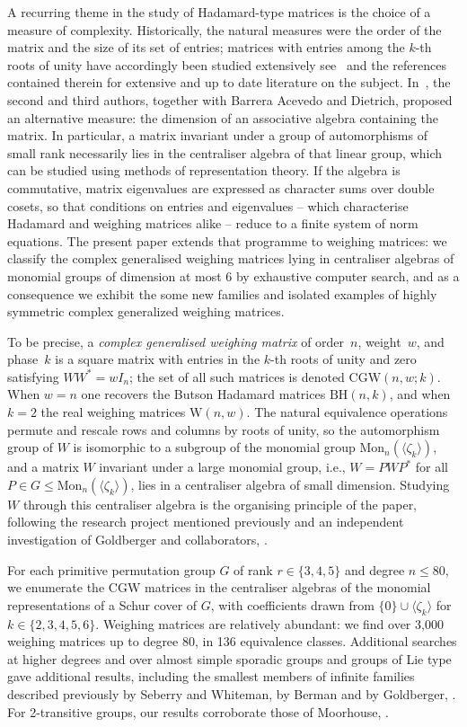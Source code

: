\documentclass{article}
\theoremstyle{definition}
\theoremstyle{remark}
\newcommand{\CGW}{\mathrm{CGW}}
\newcommand{\BH}{\mathrm{BH}}
\newcommand{\We}{\mathrm{W}}
\newcommand{\Mon}{\mathrm{Mon}}
\begin{document}
A recurring theme in the study of Hadamard-type matrices is the choice of
a measure of complexity.  Historically, the natural measures were the
order of the matrix and the size of its set of entries; matrices with
entries among the $k$-th roots of unity have accordingly been studied
extensively see~\cite{Karol} and the references contained therein for extensive and up to date literature on the subject. In~\cite{Monrep},
the second and third authors, together with Barrera Acevedo and Dietrich,
proposed an alternative measure: the dimension of an associative algebra
containing the matrix. In particular, a matrix invariant under a group of automorphisms of small rank necessarily lies in the centraliser algebra of that linear group, 
which can be studied using methods of representation theory. If the algebra is commutative, 
matrix eigenvalues are expressed as character sums over double cosets, so that conditions on entries and eigenvalues -- which characterise Hadamard and weighing matrices alike --
reduce to a finite system of norm equations.  The present paper extends that programme to weighing matrices: we classify the complex generalised weighing
matrices lying in centraliser algebras of monomial groups of dimension at most 6 by exhaustive computer search, and as a consequence we exhibit the some new families and isolated examples of highly symmetric complex generalized weighing matrices. 

To be precise, a \textit{complex generalised weighing matrix} of order~$n$, weight~$w$,
and phase~$k$ is a square matrix with entries in the $k$-th roots of unity
and zero satisfying $WW^{\ast} = wI_n$; the set of all such matrices is
denoted $\CGW(n,w;k)$.  When $w = n$ one recovers the Butson Hadamard
matrices $\BH(n,k)$, and when $k = 2$ the real weighing matrices
$\We(n,w)$.  The natural equivalence operations permute and rescale rows
and columns by roots of unity, so the automorphism group of $W$ is isomorphic to a subgroup of the monomial group $\Mon_n(\langle\zeta_k\rangle)$, and a
matrix $W$ invariant under a large monomial group, i.e., $W = PWP^{\ast}$ for all $P \in G \leq \Mon_n(\langle\zeta_k\rangle)$, lies in a centraliser
algebra of small dimension.  Studying $W$ through this centraliser algebra
is the organising principle of the paper, following the research project mentioned previously and an independent investigation of Goldberger and collaborators, \cite{Monrep,
Goldberger2024}.

For each primitive permutation group $G$
of rank $r \in \{3,4,5\}$ and degree $n \leq 80$, we enumerate the $\CGW$
matrices in the centraliser algebras of the monomial representations of a
Schur cover of $G$, with coefficients drawn from
$\{0\} \cup \langle \zeta_k \rangle$ for $k \in \{2,3,4,5,6\}$.
Weighing matrices are relatively abundant: we find over 3,000 weighing matrices 
up to degree 80, in 136 equivalence classes. Additional searches at higher degrees 
and over almost simple sporadic groups and groups of Lie type gave additional 
results, including the smallest members of infinite families described previously by 
Seberry and Whiteman, by Berman and by Goldberger, \cite{SeberryWhiteman1975, Berman1978, Goldberger2024}. For 2-transitive groups, our results corroborate those of Moorhouse, \cite{Moorhouse2001}.
\end{document}
